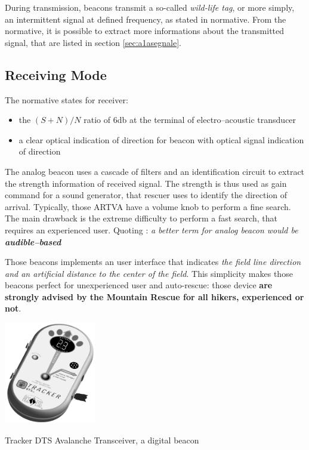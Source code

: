 During transmission, beacons transmit a so-called \emph{wild-life tag}, or more simply, an intermittent signal at defined frequency, as stated in normative\cite{NormativaARVA}. From the normative, it is possible to extract more informations about the transmitted signal, that are listed in section \ref{sec:a1asegnale}.

\subsection{Receiving Mode}

The normative states for receiver:
\begin{itemize}
	\item the $(S+N)/N$ ratio of \num{6}\si{\decibel} at the terminal of electro--acoustic transducer
	\item a clear optical indication of direction for beacon with optical signal indication of direction
\end{itemize}

The analog beacon uses a cascade of filters and an identification circuit to extract the strength information of received signal. The strength is thus used as gain command for a sound generator, that rescuer uses to identify the direction of arrival. Typically, those ARTVA have a volume knob to perform a fine search. The main drawback is the extreme difficulty to perform a fast search, that requires an experienced user. Quoting \citep{457andfuture}: \emph{a better term for analog beacon would be \textbf{audible--based}}

Those beacons implements an user interface that indicates \emph{the field line direction and an artificial distance to the center of the field}. This simplicity makes those beacons perfect for unexperienced user and auto-rescue: those device \textbf{are strongly advised by the Mountain Rescue for all hikers, experienced or not}.

\begin{marginfigure}
	\centering
	\includegraphics[width=4cm]{ch1/img/digital_baecon}
	\caption{Tracker DTS Avalanche Transceiver, a digital beacon}
\end{marginfigure}

